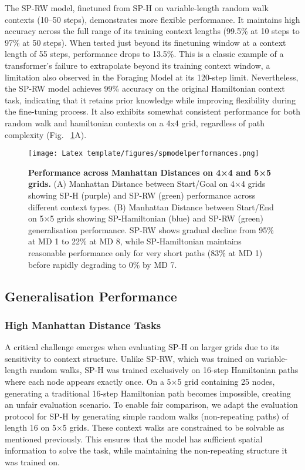 The SP-RW model, finetuned from SP-H on variable-length random walk contexts (10--50 steps), demonstrates more flexible performance. It maintains high accuracy across the full range of its training context lengths (99.5\% at 10 steps to 97\% at 50 steps). When tested just beyond its finetuning window at a context length of 55 steps, performance drops to 13.5\%. This is a classic example of a transformer's failure to extrapolate beyond its training context window, a limitation also observed in the Foraging Model at its 120-step limit. Nevertheless, the SP-RW model achieves 99\% accuracy on the original Hamiltonian context task, indicating that it retains prior knowledge while improving flexibility during the fine-tuning process. It also exhibits somewhat consistent performance for both random walk and hamiltonian contexts on a 4x4 grid, regardless of path complexity (Fig. ~\ref{fig:sp_manhattan_distance}A).


\begin{figure}[h]
\centering
\texttt{[image: Latex template/figures/spmodelperformances.png]}
\caption[Performance across Manhattan Distances on 4×4 and 5×5 grids.]{\textbf{Performance across Manhattan Distances on 4×4 and 5×5 grids.} (A) Manhattan Distance between Start/Goal on 4×4 grids showing SP-H (purple) and SP-RW (green) performance across different context types. (B) Manhattan Distance between Start/End on 5×5 grids showing SP-Hamiltonian (blue) and SP-RW (green) generalisation performance. SP-RW shows gradual decline from 95\% at MD 1 to 22\% at MD 8, while SP-Hamiltonian maintains reasonable performance only for very short paths (83\% at MD 1) before rapidly degrading to 0\% by MD 7.}
\label{fig:sp_manhattan_distance}
\end{figure}


\subsection{Generalisation Performance}


\subsubsection{High Manhattan Distance Tasks}

A critical challenge emerges when evaluating SP-H on larger grids due to its sensitivity to context structure. Unlike SP-RW, which was trained on variable-length random walks, SP-H was trained exclusively on 16-step Hamiltonian paths where each node appears exactly once. On a 5×5 grid containing 25 nodes, generating a traditional 16-step Hamiltonian path becomes impossible, creating an unfair evaluation scenario. To enable fair comparison, we adapt the evaluation protocol for SP-H by generating simple random walks (non-repeating paths) of length 16 on 5×5 grids. These context walks are constrained to be solvable as mentioned previously. This ensures that the model has sufficient spatial information to solve the task, while maintaining the non-repeating structure it was trained on.

